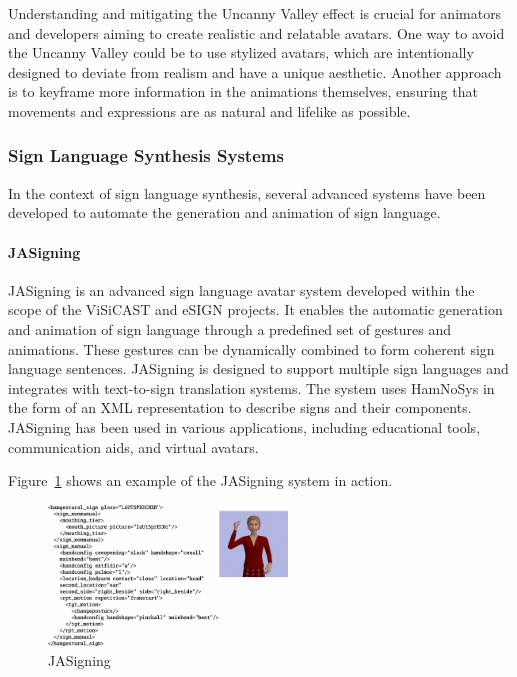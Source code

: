 \documentclass[../../main.tex]{subfiles}
\begin{document}
Understanding and mitigating the Uncanny Valley effect is crucial for animators and developers aiming to create realistic and relatable avatars. One way to avoid the Uncanny Valley could be to use stylized avatars, which are intentionally designed to deviate from realism and have a unique aesthetic. Another approach is to keyframe more information in the animations themselves, ensuring that movements and expressions are as natural and lifelike as possible.

\subsubsection{Sign Language Synthesis Systems}
\label{ch:background_work:sign_language_synthesis:3d_techniques:sign_language_synthesis_systems}

In the context of sign language synthesis, several advanced systems have been developed to automate the generation and animation of sign language.

\paragraph{JASigning}
\label{ch:background_work:sign_language_synthesis:3d_techniques:sign_language_synthesis_systems:jasigning}

JASigning is an advanced sign language avatar system developed within the scope of the ViSiCAST and eSIGN projects. It enables the automatic generation and animation of sign language through a predefined set of gestures and animations. These gestures can be dynamically combined to form coherent sign language sentences. JASigning is designed to support multiple sign languages and integrates with text-to-sign translation systems. The system uses HamNoSys in the form of an XML representation to describe signs and their components. JASigning has been used in various applications, including educational tools, communication aids, and virtual avatars.

Figure~\ref{fig:jasigning} shows an example of the JASigning system in action.

\begin{figure} 
  \centering \includegraphics[width = 2.5in]{chapters/background_work/images/jasigning.png} 
  \caption{JASigning} 
  \label{fig:jasigning} 
\end{figure}
\end{document}
